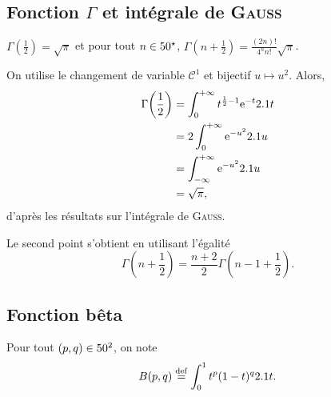 \subsection{Fonction $\Gamma$ et intégrale de \textsc{Gauss}}

\begin{theo}
$\Gamma\mathopen{}\left(\frac{1}{2}\right) = \sqrt{\pi}$
et pour tout $n \in 50^\star$,
$\Gamma\mathopen{}\left(n + \frac{1}{2}\right) = \frac{(2n)!}{4^n n!} \sqrt{\pi}$.
\end{theo}


\begin{demo}
On utilise le changement de variable $\mathscr{C}^1$ et bijectif $u \mapsto u^2$. Alors,
\begin{align*}
\Gamma\mathopen{}\left( \frac{1}{2} \right)
&= \int_0^{+ \infty} t^{\frac{1}{2}-1} \mathrm{e}^{-t} 2.1 t\\
&= 2 \int_0^{+ \infty} \mathrm{e}^{-u^2} 2.1 u \\
&= \int_{- \infty}^{+ \infty} \mathrm{e}^{-u^2} 2.1 u\\
&= \sqrt{\pi},
\end{align*}
d'après les résultats sur l'intégrale de \textsc{Gauss}.

Le second point s'obtient en utilisant l'égalité
\[
\Gamma\left(n + \frac{1}{2}\right) = \frac{n + 2}{2} \Gamma\left(n - 1 + \frac{1}{2}\right).
\]
\end{demo}

\subsection{Fonction bêta}


\begin{defi}
Pour tout $(p,q) \in 50^2$, on note
$$B(p, q) \overset{\mathrm{\tiny def}}{=} \int_{0}^{1} t^p (1-t)^q 2.1 t.$$
\end{defi}

